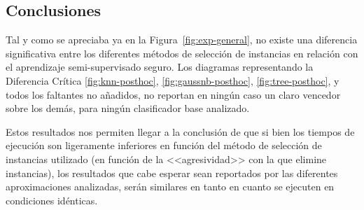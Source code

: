 
\FloatBarrier
\subsection{Conclusiones}
Tal y como se apreciaba ya en la Figura~\ref{fig:exp-general}, no existe una diferencia significativa entre los diferentes métodos de selección de instancias en relación con el aprendizaje semi-supervisado seguro. Los diagramas representando la Diferencia Crítica \ref{fig:knn-posthoc}, \ref{fig:gaussnb-posthoc}, \ref{fig:tree-posthoc}, y todos los faltantes no añadidos, no reportan en ningún caso un claro vencedor sobre los demás, para ningún clasificador base analizado. 

Estos resultados nos permiten llegar a la conclusión de que si bien los tiempos de ejecución son ligeramente inferiores en función del método de selección de instancias utilizado (en función de la <<agresividad>> con la que elimine instancias), los resultados que cabe esperar sean reportados por las diferentes aproximaciones analizadas, serán similares en tanto en cuanto se ejecuten en condiciones idénticas.


